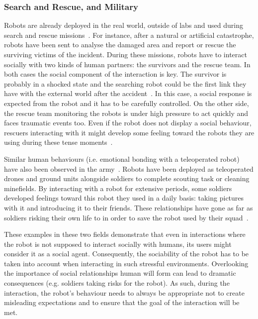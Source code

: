 \subsubsection{Search and Rescue, and Military} 
    Robots are already deployed in the real world, outside of labs and used during search and rescue missions~\citep{casper2003human,murphy2004human}. For instance, after a natural or artificial catastrophe, robots have been sent to analyse the damaged area and report or rescue the surviving victims of the incident. During these missions, robots have to interact socially with two kinds of human partners: the survivors and the rescue team. In both cases the social component of the interaction is key. The survivor is probably in a shocked state and the searching robot could be the first link they have with the external world after the accident~\citep{murphy2008search}. In this case, a social response is expected from the robot and it has to be carefully controlled. On the other side, the rescue team monitoring the robots is under high pressure to act quickly and faces traumatic events too. Even if the robot does not display a social behaviour, rescuers interacting with it might develop some feeling toward the robots they are using during these tense moments~\citep{fincannon2004evidence}.
	
    Similar human behaviours (i.e. emotional bonding with a teleoperated robot) have also been observed in the army~\citep{singer2009wired}. Robots have been deployed as teleoperated drones and ground units alongside soldiers to complete scouting task or cleaning minefields. By interacting with a robot for extensive periods, some soldiers developed feelings toward this robot they used in a daily basis: taking pictures with it and introducing it to their friends. These relationships have gone as far as soldiers risking their own life to in order to save the robot used by their squad~\citep{singer2009wired}. 
    
    These examples in these two fields demonstrate that even in interactions where the robot is not supposed to interact socially with humans, its users might consider it as a social agent. Consequently, the sociability of the robot has to be taken into account when interacting in such stressful environments. Overlooking the importance of social relationships human will form can lead to dramatic consequences (e.g. soldiers taking risks for the robot). As such, during the interaction, the robot's behaviour needs to always be appropriate not to create misleading expectations and to ensure that the goal of the interaction will be met.
		
